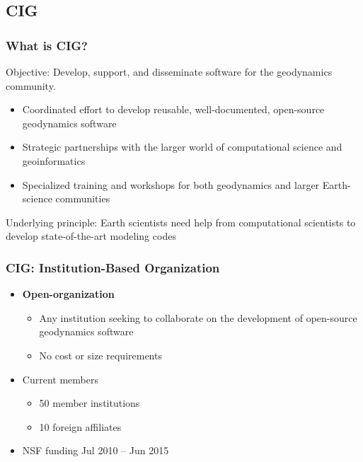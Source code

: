 \documentclass{beamer}
\begin{document}
\subsection{CIG}

\begin{frame}
  \frametitle{What is CIG?}
 
  \vfill

  Objective: Develop, support, and disseminate software for the
  geodynamics community.

  \vfill

  \begin{itemize}
  \item Coordinated effort to develop reusable, well-documented,
    open-source geodynamics software
  \item Strategic partnerships with the larger world of
    computational science and geoinformatics
  \item Specialized training and workshops for both geodynamics and
    larger Earth-science communities
  \end{itemize}

  \vfill
 
  Underlying principle: Earth scientists need help from computational
  scientists to develop state-of-the-art modeling codes

\end{frame}


\begin{frame}
  \frametitle{CIG: Institution-Based Organization}
 
  \begin{itemize}
  \item {\bf Open-organization}
    \begin{itemize}
    \item Any institution seeking to collaborate on the development of
      open-source geodynamics software
    \item No cost or size requirements
    \end{itemize}
  \item Current members
    \begin{itemize}
    \item 50 member institutions
    \item 10 foreign affiliates
    \end{itemize}
  \item NSF funding Jul 2010 -- Jun 2015
 \end{itemize}
\end{frame}
\end{document}
